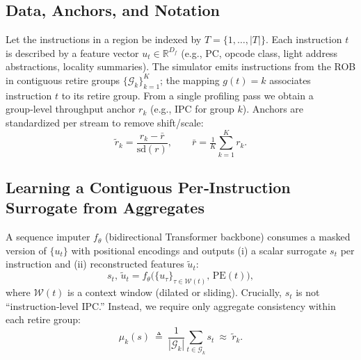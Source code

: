 \subsection{Data, Anchors, and Notation}
Let the instructions in a region be indexed by \(T=\{1,\ldots,|T|\}\). Each instruction \(t\) is described by a feature vector \(u_t\in\mathbb{R}^{D_f}\) (e.g., PC, opcode class, light address abstractions, locality summaries). The simulator emits instructions from the ROB in contiguous retire groups \(\{\mathcal{G}_k\}_{k=1}^K\); the mapping \(g(t)=k\) associates instruction \(t\) to its retire group. From a single profiling pass we obtain a group‑level throughput anchor \(r_k\) (e.g., IPC for group \(k\)). Anchors are standardized per stream to remove shift/scale:
\[
\tilde{r}_k=\frac{r_k-\bar{r}}{\mathrm{sd}(r)},\qquad \bar{r}=\tfrac{1}{K}\sum_{k=1}^Kr_k.
\]

\subsection{Learning a Contiguous Per‑Instruction Surrogate from Aggregates}
A sequence imputer \(f_\theta\) (bidirectional Transformer backbone) consumes a masked version of \(\{u_t\}\) with positional encodings and outputs (i) a scalar surrogate \(s_t\) per instruction and (ii) reconstructed features \(\tilde{u}_t\):
\[
s_t,\,\tilde{u}_t=f_\theta\!\big(\{u_\tau\}_{\tau\in\mathcal{W}(t)},\,\mathrm{PE}(t)\big),
\]
where \(\mathcal{W}(t)\) is a context window (dilated or sliding). Crucially, \(s_t\) is not “instruction‑level IPC.” Instead, we require only aggregate consistency within each retire group:
\begin{equation}
\mu_k(s)\ \triangleq\ \frac{1}{|\mathcal{G}_k|}\sum_{t\in\mathcal{G}_k}s_t\ \approx\ \tilde{r}_k.
\label{eq:group-avg}
\end{equation}

